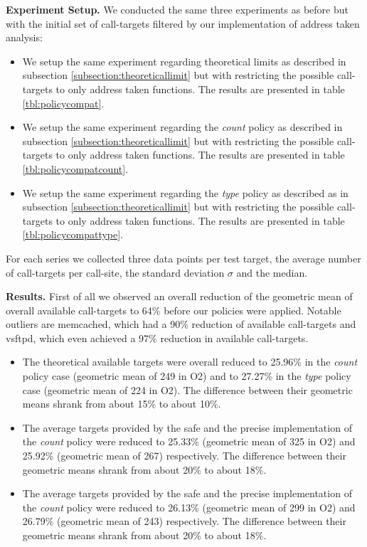 \textbf{Experiment Setup.} We conducted the same three experiments as before but with the initial set of call-targets filtered by our implementation of address taken analysis:
\begin{itemize}
\item We setup the same experiment regarding theoretical limits as described in subsection \ref{subsection:theoreticallimit} but with restricting the possible call-targets 
to only address taken functions. The results are presented in table \ref{tbl:policycompat}.
\item We setup the same experiment regarding the \textit{count} policy as described in subsection \ref{subsection:theoreticallimit} but with restricting the possible call-targets
to only address taken functions. The results are presented in table \ref{tbl:policycompatcount}.
\item We setup the same experiment regarding the \textit{type} policy as described as in subsection \ref{subsection:theoreticallimit} but with restricting the possible call-targets
to only address taken functions. The results are presented in table \ref{tbl:policycompattype}.
\end{itemize}
For each series we collected three data points per test target, the average number of call-targets per call-site, the standard deviation $\sigma$ and the median.

\textbf{Results.} First of all we observed an overall reduction of the geometric mean of overall available call-targets to 64\% before our policies were applied. Notable outliers
are memcached, which had a 90\% reduction of available call-targets and vsftpd, which even achieved a 97\% reduction in available call-targets.
\begin{itemize}
\item The theoretical available targets were overall reduced to 25.96\% in the \textit{count} policy case  (geometric mean of 249 in O2) and to 27.27\% in the \textit{type} 
policy case  (geometric mean of 224 in O2). The difference between their geometric means shrank from about 15\% to about 10\%.
\item The average targets provided by the safe and the precise implementation of the \textit{count} policy were reduced to 25.33\% (geometric mean of 325 in O2) and 25.92\% 
(geometric mean of 267) respectively. The difference between their geometric means shrank from about 20\% to about 18\%.
\item The average targets provided by the safe and the precise implementation of the \textit{count} policy were reduced to 26.13\% (geometric mean of 299 in O2) and 26.79\% 
(geometric mean of 243) respectively. The difference between their geometric means shrank from about 20\% to about 18\%.
\end{itemize}

